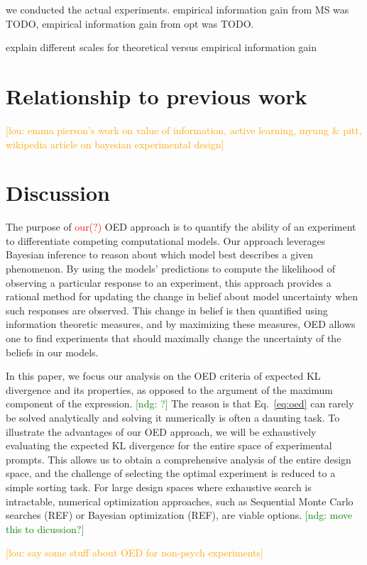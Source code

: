 \documentclass{article}
\newcommand{\red}[1]{\textcolor{Red}{#1}}
\newcommand{\ndg}[1]{\textcolor{Green}{[ndg: #1]}}
\newcommand{\lou}[1]{\textcolor{orange}{[lou: #1]}}
\newcommand{\cas}[1]{ \textsf{\color{darkgray} \scriptsize #1} }
\begin{document}
\cas{we conducted the actual experiments. empirical information gain from MS was TODO, empirical information gain from opt was TODO.}

\cas{explain different scales for theoretical versus empirical information gain}

\section{Relationship to previous work}
\lou{emma pierson's work on value of information, active learning, myung \& pitt, wikipedia article on bayesian experimental design}

\section{Discussion}

The purpose of \red{our(?)} OED approach is to quantify the ability of an experiment to differentiate competing computational models. Our approach leverages Bayesian inference to reason about which model best describes a given phenomenon. By using the models' predictions to compute the likelihood of observing a particular response to an experiment, this approach provides a rational method for updating the change in belief about model uncertainty when such responses are observed. This change in belief is then quantified using information theoretic measures, and by maximizing these measures, OED allows one to find experiments that should maximally change the uncertainty of the beliefs in our models.


In this paper, we focus our analysis on the OED criteria of expected KL divergence and its properties, as opposed to the argument of the maximum component of the expression. \ndg{?} The reason is that Eq.~\ref{eq:oed} can rarely be solved analytically and solving it numerically is often a daunting task. To illustrate the advantages of our OED approach, we will be exhaustively evaluating the expected KL divergence for the entire  space of experimental prompts. This allows us to obtain a comprehensive analysis of the entire design space, and the challenge of selecting the optimal experiment is reduced to a simple sorting task. For large design spaces where exhaustive search is intractable, numerical optimization approaches, such as Sequential Monte Carlo searches (REF) or Bayesian optimization (REF), are viable options.  \ndg{move this to dicussion?}



\lou{say some stuff about OED for non-psych experiments}



\end{document}
